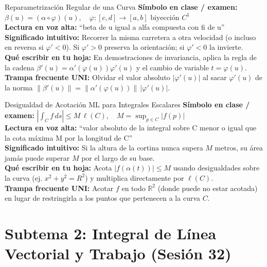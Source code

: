 \documentclass[11pt,a4paper]{article}
\begin{document}
\begin{definicionbox}{Reparametrización Regular de una Curva}
\textbf{Símbolo en clase / examen:} $\beta(u) = (\alpha \circ \varphi)(u), \quad \varphi : [c,d] \to [a,b] \text{ biyección } C^1$\\[0.15cm]
\textbf{Lectura en voz alta:} ``beta de u igual a alfa compuesta con fi de u''\\[0.12cm]
\textbf{Significado intuitivo:} Recorrer la misma carretera a otra velocidad (o incluso en reversa si $\varphi' < 0$). Si $\varphi' > 0$ preserva la orientación; si $\varphi' < 0$ la invierte.\\[0.12cm]
\textbf{Qué escribir en tu hoja:} En demostraciones de invariancia, aplica la regla de la cadena $\beta'(u) = \alpha'(\varphi(u))\varphi'(u)$ y el cambio de variable $t = \varphi(u)$.\\[0.12cm]
\textbf{Trampa frecuente UNI:} Olvidar el valor absoluto $|\varphi'(u)|$ al sacar $\varphi'(u)$ de la norma $\|\beta'(u)\| = \|\alpha'(\varphi(u))\|\,|\varphi'(u)|$.
\end{definicionbox}

\begin{definicionbox}{Desigualdad de Acotación ML para Integrales Escalares}
\textbf{Símbolo en clase / examen:} $\left|\int_C f\,ds\right| \le M\,\ell(C), \quad M = \sup_{p \in C} |f(p)|$\\[0.15cm]
\textbf{Lectura en voz alta:} ``valor absoluto de la integral sobre C menor o igual que la cota máxima M por la longitud de C''\\[0.12cm]
\textbf{Significado intuitivo:} Si la altura de la cortina nunca supera $M$ metros, su área jamás puede superar $M$ por el largo de su base.\\[0.12cm]
\textbf{Qué escribir en tu hoja:} Acota $|f(\alpha(t))| \le M$ usando desigualdades sobre la curva (ej. $x^2+y^2 = R^2$) y multiplica directamente por $\ell(C)$.\\[0.12cm]
\textbf{Trampa frecuente UNI:} Acotar $f$ en todo $\mathbb{R}^2$ (donde puede no estar acotada) en lugar de restringirla a los puntos que pertenecen a la curva $C$.
\end{definicionbox}

\section{Subtema 2: Integral de Línea Vectorial y Trabajo (Sesión 32)}
\end{document}
